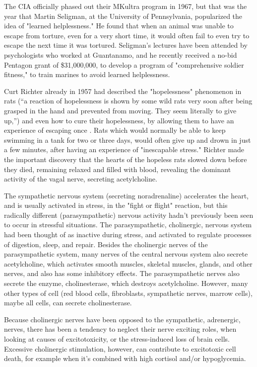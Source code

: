 \documentclass{article}
\begin{document}
The CIA officially phased out their MKultra program in 1967, but that was the year that Martin Seligman, at the University of Pennsylvania, popularized the idea of "learned helplessness." He found that when an animal was unable to escape from torture, even for a very short time, it would often fail to even try to escape the next time it was tortured. Seligman's lectures have been attended by psychologists who worked at Guantanamo, and he recently received a no-bid Pentagon grant of \$31,000,000, to develop a program of "comprehensive soldier fitness," to train marines to avoid learned helplessness.

Curt Richter already in 1957 had described the "hopelessness" phenomenon in rats (``a reaction of hopelessness is shown by some wild rats very soon after being grasped in the hand and prevented from moving. They seem literally to give up,'') and even how to cure their hopelessness, by allowing them to have an experience of escaping once \cite{Richter1957, Richter1958}. Rats which would normally be able to keep swimming in a tank for two or three days, would often give up and drown in just a few minutes, after having an experience of "inescapable stress." Richter made the important discovery that the hearts of the hopeless rats slowed down before they died, remaining relaxed and filled with blood, revealing the dominant activity of the vagal nerve, secreting acetylcholine.

The sympathetic nervous system (secreting noradrenaline) accelerates the heart, and is usually activated in stress, in the "fight or flight" reaction, but this radically different (parasympathetic) nervous activity hadn't previously been seen to occur in stressful situations. The parasympathetic, cholinergic, nervous system had been thought of as inactive during stress, and activated to regulate processes of digestion, sleep, and repair. Besides the cholinergic nerves of the parasympathetic system, many nerves of the central nervous system also secrete acetylcholine, which activates smooth muscles, skeletal muscles, glands, and other nerves, and also has some inhibitory effects. The parasympathetic nerves also secrete the enzyme, cholinesterase, which destroys acetylcholine. However, many other types of cell (red blood cells, fibroblasts, sympathetic nerves, marrow cells), maybe all cells, can secrete cholinesterase.

Because cholinergic nerves have been opposed to the sympathetic, adrenergic, nerves, there has been a tendency to neglect their nerve exciting roles, when looking at causes of excitotoxicity, or the stress-induced loss of brain cells. Excessive cholinergic stimulation, however, can contribute to excitotoxic cell death, for example when it's combined with high cortisol and/or hypoglycemia.
\end{document}
